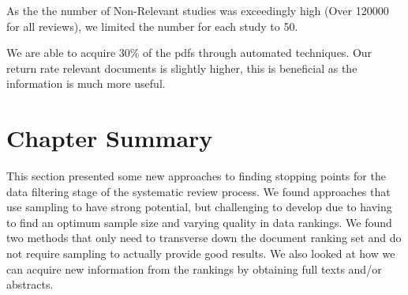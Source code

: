 As the the number of Non-Relevant studies was exceedingly high (Over 120000 for all reviews), we limited the number for each study to 50. 

We are able to acquire  30\% of the pdfs through automated techniques. Our return rate relevant documents is slightly higher, this is beneficial as the information is much more useful.


\section{Chapter Summary}

This section presented some new approaches to finding stopping points for the data filtering stage of the systematic review process. We found approaches that use sampling to have strong potential, but challenging to develop due to having to find an optimum sample size and varying quality in data rankings. We found two methods that only need to transverse down the document ranking set and do not require sampling to actually provide good results. We also looked at how we can acquire new information from the rankings by obtaining full texts and/or abstracts.
